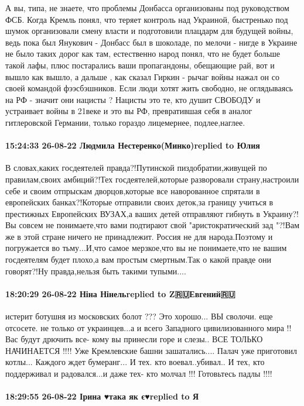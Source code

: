А вы, типа, не знаете, что проблемы Донбасса организованы под руководством ФСБ.
Когда Кремль понял, что теряет контроль над Украиной, быстренько под шумок
организовали смену власти и подготовили плацдарм для будущей войны, ведь пока
был Янукович - Донбасс был в шоколаде, по мелочи - нигде в Украине не было
таких дорог как там, естественно народ понял, что не будет больше такой лафы,
плюс постарались ваши пропагандоны, обещающие рай, вот и вышло как вышло, а
дальше , как сказал Гиркин - рычаг войны нажал он со своей командой
фээсбэшников. Если люди хотят жить свободно, не оглядываясь на РФ - значит они
нацисты ? Нацисты это те, кто душит СВОБОДУ и устраивает войны в 21веке и это
вы РФ, превратившая себя в аналог гитлеровской Германии, только гораздо
лицемернее, подлее,наглее.

\paragraph{15:24:33 26-08-22 Людмила Нестеренко(Минко)replied to Юлия}

В словах,каких госдеятелей правда?!Путинской пиздобратии,живущей по
правилам,своих амбиций?!Тех госдеятелей,которые разворовали страну,настроили
себе и своим отпрыскам дворцов,которые все наворованное спрятали в европейских
банках?!Которые отправили своих деток,за границу учиться в престижных
Европейских ВУЗАХ,а ваших детей отправляют гибнуть в Украину?!Вы совсем не
понимаете,что вами подтирают свой "аристократический зад "?!Вам же в этой
стране ничего не принадлежит. Россия не для народа.Поэтому и погружается во
тьму...И,что самое мерзкое,что вы не понимаете,что не вашим госдеятелям будет
плохо,а вам простым смертным.Так о какой правде они говорят?!Ну правда,нельзя
быть такими тупыми....

\paragraph{18:20:29 26-08-22 Ніна Нінельreplied to Z🇷🇺Евгений🇷🇺}

истерит ботушня из московских болот ??? Это хорошо... ВЫ сволочи. еще отсосете.
не только от украинцев...а и всего Западного цивилизованного мира !! Вас будут
дрючить все- кому вы принесли горе и слезы.. ВСЕ ТОЛЬКО НАЧИНАЕТСЯ !!!! Уже
Кремлевские башни зашатались.... Палач уже приготовил котлы... Каждого ждет
бумеранг... И тех. кто воевал..убивал.. И тех, кто поддерживал и радовался...и
даже тех- кто молчал !!! Готовьтесь падлы !!!!

\paragraph{18:29:55 26-08-22 Ірина ♥така як є♥replied to Я}

